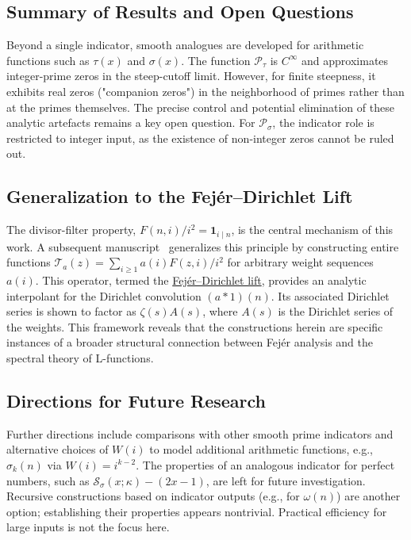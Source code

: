 \documentclass[11pt,a4paper]{amsart}
\theoremstyle{plain}
\theoremstyle{definition}
\theoremstyle{remark}
\begin{document}
\subsection{Summary of Results and Open Questions}
Beyond a single indicator, smooth analogues are developed for arithmetic functions such as $\tau(x)$ and $\sigma(x)$. The function $\mathcal{P}_{\tau}$ is $C^\infty$ and approximates integer-prime zeros in the steep-cutoff limit. However, for finite steepness, it exhibits real zeros ("companion zeros") in the neighborhood of primes rather than at the primes themselves. The precise control and potential elimination of these analytic artefacts remains a key open question. For $\mathcal{P}_{\sigma}$, the indicator role is restricted to integer input, as the existence of non-integer zeros cannot be ruled out.

\subsection{Generalization to the Fej\'er--Dirichlet Lift}
The divisor-filter property, $F(n,i)/i^2 = \mathbf{1}_{i\mid n}$, is the central mechanism of this work. A subsequent manuscript~\cite{fuchs2025-fejer} generalizes this principle by constructing entire functions $\mathcal{T}_a(z) = \sum_{i\ge1} a(i) F(z,i)/i^2$ for arbitrary weight sequences $a(i)$. This operator, termed the \href{https://arxiv.org/abs/2509.12297}{Fej\'er--Dirichlet lift}, provides an analytic interpolant for the Dirichlet convolution $(a*1)(n)$. Its associated Dirichlet series is shown to factor as $\zeta(s)A(s)$, where $A(s)$ is the Dirichlet series of the weights. This framework reveals that the constructions herein are specific instances of a broader structural connection between Fejér analysis and the spectral theory of L-functions.

\subsection{Directions for Future Research}
Further directions include comparisons with other smooth prime indicators and alternative choices of $W(i)$ to model additional arithmetic functions, e.g., $\sigma_k(n)$ via $W(i)=i^{k-2}$. The properties of an analogous indicator for perfect numbers, such as $\mathcal{S}_\sigma(x;\kappa)-(2x-1)$, are left for future investigation. Recursive constructions based on indicator outputs (e.g., for $\omega(n)$) are another option; establishing their properties appears nontrivial. Practical efficiency for large inputs is not the focus here.
\end{document}
